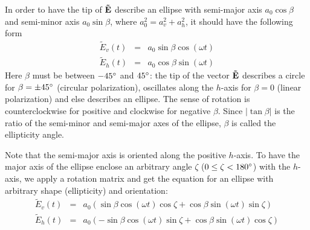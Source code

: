 In order to have the tip of $\mathbf{\tilde{E}}$ describe an ellipse with semi-major axis $a_0 \cos\beta$
and
semi-minor axis $a_0 \sin\beta$, where $a_0^2 = a_v^2 + a_h^2$, 
it should have the following form
\begin{eqnarray}
  \label{eq:polarization:ellipse_parallel}
 \tilde{E}_v (t) &=&   a_0 \sin\beta \cos(\omega t)\\
 \tilde{E}_h (t) &=&   a_0 \cos\beta \sin(\omega t)
\end{eqnarray}
Here $\beta$ must be between $-45^\circ$ and $45^\circ$: the tip of
the vector $\mathbf{\tilde{E}}$ describes a circle for $\beta = \pm
45^\circ$ (circular polarization), oscillates along the $h$-axis for
$\beta = 0$ (linear polarization) and else describes an ellipse. The
sense of rotation is counterclockwise for positive and clockwise for
negative $\beta$. Since $|\tan\beta|$ is the ratio of the semi-minor
and semi-major axes of the ellipse, $\beta$ is called the ellipticity
angle.

Note that the semi-major axis is oriented along the positive $h$-axis.  To
have the major axis of the ellipse enclose an arbitrary angle $\zeta$
($0 \leq \zeta < 180^\circ$) with the $h$-axis, we apply a rotation
matrix and get the equation for an ellipse with arbitrary shape
(ellipticity) and orientation:
\begin{eqnarray}
  \label{eq:polarization:ellipse_rotated1}
 \tilde{E}_v (t) &=&  a_0(  \sin\beta \cos(\omega t) \cos\zeta
                           +\cos\beta \sin(\omega t) \sin\zeta )\\
  \label{eq:polarization:ellipse_rotated2}
 \tilde{E}_h (t) &=&  a_0( -\sin\beta \cos(\omega t) \sin\zeta
                           +\cos\beta \sin(\omega t) \cos\zeta )
\end{eqnarray}

